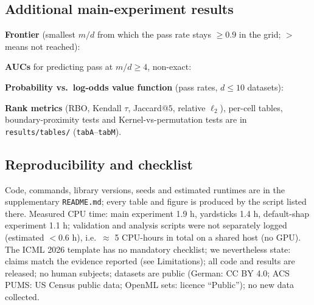 \documentclass{article}
\begin{document}
\subsection{Additional main-experiment results}\label{app:more}
\textbf{Frontier} (smallest $m/d$ from which the pass rate stays $\ge0.9$ in the grid; $>$ means not reached):
\begin{center}\small\end{center}
\textbf{AUCs} for predicting pass at $m/d\ge4$, non-exact:
\begin{center}\small\end{center}
\textbf{Probability vs.\ log-odds value function} (pass rates, $d\le10$ datasets):
\begin{center}\small\end{center}
\textbf{Rank metrics} (RBO, Kendall $\tau$, Jaccard$@5$, relative $\ell_2$), per-cell tables, boundary-proximity tests and Kernel-vs-permutation tests are in \texttt{results/tables/} (\texttt{tabA}--\texttt{tabM}).

\subsection{Reproducibility and checklist}\label{app:repro}
Code, commands, library versions, seeds and estimated runtimes are in the supplementary \texttt{README.md}; every table and figure is produced by the script listed there. Measured CPU time: main experiment 1.9 h, yardsticks 1.4 h, default-shap experiment 1.1 h; validation and analysis scripts were not separately logged (estimated $<0.6$ h), i.e.\ $\approx$ 5 CPU-hours in total on a shared host (no GPU). The ICML 2026 template has no mandatory checklist; we nevertheless state: claims match the evidence reported (see Limitations); all code and results are released; no human subjects; datasets are public (German: CC BY 4.0; ACS PUMS: US Census public data; OpenML sets: licence ``Public''); no new data collected.
\end{document}
